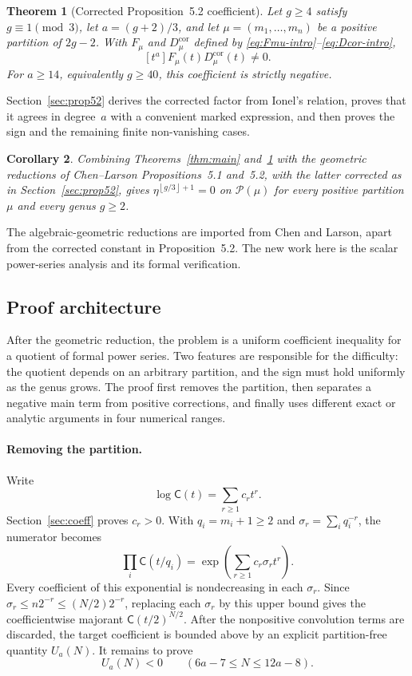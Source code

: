 \documentclass[11pt]{article}
\newtheorem{theorem}{Theorem}[section]
\newtheorem{corollary}[theorem]{Corollary}
\theoremstyle{definition}
\theoremstyle{remark}
\newcommand{\C}{\mathsf C}
\newcommand{\floor}[1]{\left\lfloor #1\right\rfloor}
\begin{document}
\begin{theorem}[Corrected Proposition~5.2 coefficient]\label{thm:main52}
Let $g\ge4$ satisfy $g\equiv1\pmod3$, let $a=(g+2)/3$, and let
$\mu=(m_1,\ldots,m_n)$ be a positive partition of $2g-2$.  With
$F_\mu$ and $D_\mu^{\mathrm{cor}}$ defined by
\eqref{eq:Fmu-intro}--\eqref{eq:Dcor-intro},
\[
  [t^a]F_\mu(t)D_\mu^{\mathrm{cor}}(t)\ne0.
\]
For $a\ge14$, equivalently $g\ge40$, this coefficient is strictly negative.
\end{theorem}

Section~\ref{sec:prop52} derives the corrected factor from Ionel's relation,
proves that it agrees in degree~$a$ with a convenient marked expression, and
then proves the sign and the remaining finite non-vanishing cases.

\begin{corollary}\label{cor:geometric52}
Combining Theorems~\ref{thm:main} and~\ref{thm:main52} with the geometric
reductions of Chen--Larson Propositions~5.1 and~5.2, with the latter corrected
as in Section~\ref{sec:prop52}, gives
$\eta^{\floor{g/3}+1}=0$ on $\mathcal P(\mu)$ for every positive partition
$\mu$ and every genus $g\ge2$.
\end{corollary}

The algebraic-geometric reductions are imported from Chen and Larson, apart
from the corrected constant in Proposition~5.2.  The new work here is the
scalar power-series analysis and its formal verification.

\subsection{Proof architecture}\label{sec:outline}

After the geometric reduction, the problem is a uniform coefficient inequality
for a quotient of formal power series.  Two features are responsible for the
difficulty: the quotient depends on an arbitrary partition, and the sign must
hold uniformly as the genus grows.  The proof first removes the partition,
then separates a negative main term from positive corrections, and finally
uses different exact or analytic arguments in four numerical ranges.

\paragraph{Removing the partition.}
Write
\[
  \log\C(t)=\sum_{r\ge1}c_rt^r.
\]
Section~\ref{sec:coeff} proves $c_r>0$.  With $q_i=m_i+1\ge2$ and
$\sigma_r=\sum_iq_i^{-r}$, the numerator becomes
\[
  \prod_i\C(t/q_i)=\exp\!\left(\sum_{r\ge1}c_r\sigma_rt^r\right).
\]
Every coefficient of this exponential is nondecreasing in each $\sigma_r$.
Since $\sigma_r\le n2^{-r}\le(N/2)2^{-r}$, replacing each $\sigma_r$ by this
upper bound gives the coefficientwise majorant $\C(t/2)^{N/2}$.  After the
nonpositive convolution terms are discarded, the target coefficient is
bounded above by an explicit partition-free quantity $U_a(N)$.  It remains to
prove
\[
  U_a(N)<0\qquad(6a-7\le N\le12a-8).
\]
\end{document}
